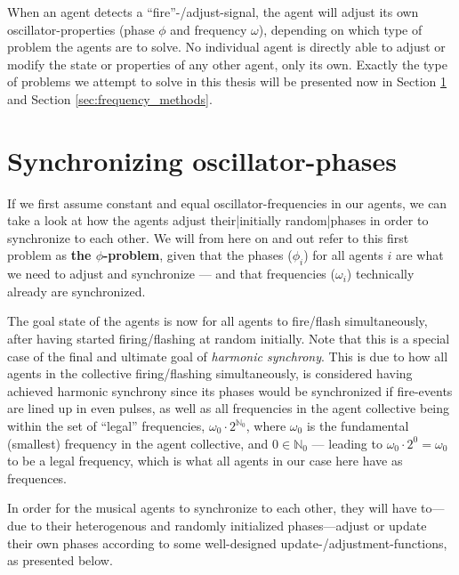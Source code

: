 	When an agent detects a ``fire''-/adjust-signal, the agent will adjust its own oscillator-properties (phase $\phi$ and frequency $\omega$), depending on which type of problem the agents are to solve. No individual agent is directly able to adjust or modify the state or properties of any other agent, only its own. Exactly the type of problems we attempt to solve in this thesis will be presented now in Section \ref{sec:phase_methods} and Section \ref{sec:frequency_methods}.
	
	
	
	
	
	
	
	
	
	




\section{Synchronizing oscillator-phases}
\label{sec:phase_methods}

	If we first assume constant and equal oscillator-frequencies in our agents, we can take a look at how the agents adjust their|initially random|phases in order to synchronize to each other. We will from here on and out refer to this first problem as \textbf{the $\phi$-problem}, given that the phases ($\phi_i$) for all agents $i$ are what we need to adjust and synchronize — and that frequencies ($\omega_i$) technically already are synchronized.
	
	The goal state of the agents is now for all agents to fire/flash simultaneously, after having started firing/flashing at random initially. Note that this is a special case of the final and ultimate goal of \textit{harmonic synchrony}. This is due to how all agents in the collective firing/flashing simultaneously, is considered having achieved harmonic synchrony since its phases would be synchronized if fire-events are lined up in even pulses, as well as all frequencies in the agent collective being within the set of ``legal'' frequencies, $\omega_{0} \cdot 2^{\mathbb{N}_0}$, where $\omega_0$ is the fundamental (smallest) frequency in the agent collective, and $0 \in \mathbb{N}_0$ — leading to $\omega_0 \cdot 2^0 = \omega_0$ to be a legal frequency, which is what all agents in our case here have as frequences.
	
	In order for the musical agents to synchronize to each other, they will have to—due to their heterogenous and randomly initialized phases—adjust or update their own phases according to some well-designed update-/adjustment-functions, as presented below.
	
